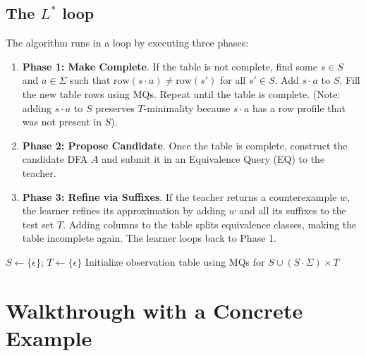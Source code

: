 \subsection{The $L^*$ loop}

The algorithm runs in a loop by executing three phases:
\begin{enumerate}
  \item \textbf{Phase 1: Make Complete}. If the table is not complete, find some $s \in S$ and $a \in \Sigma$ such that $\text{row}(s \cdot a) \neq \text{row}(s')$ for all $s' \in S$. Add $s \cdot a$ to $S$. Fill the new table rows using MQs. Repeat until the table is complete. (Note: adding $s \cdot a$ to $S$ preserves $T$-minimality because $s \cdot a$ has a row profile that was not present in $S$).
  \item \textbf{Phase 2: Propose Candidate}. Once the table is complete, construct the candidate DFA $A$ and submit it in an Equivalence Query (EQ) to the teacher.
  \item \textbf{Phase 3: Refine via Suffixes}. If the teacher returns a counterexample $w$, the learner refines its approximation by adding $w$ and all its suffixes to the test set $T$. Adding columns to the table splits equivalence classes, making the table incomplete again. The learner loops back to Phase 1.
\end{enumerate}

\begin{algorithm}[H]
\SetAlgoLined
\DontPrintSemicolon
\caption{Angluin's $L^*$ active-learning algorithm}
\label{alg:lstar}
$S \leftarrow \{\epsilon\}$; \quad $T \leftarrow \{\epsilon\}$\;
Initialize observation table using MQs for $S \cup (S \cdot \Sigma) \times T$\;
\end{algorithm}

\section{Walkthrough with a Concrete Example}
\label{sec:lstar-walkthrough}

